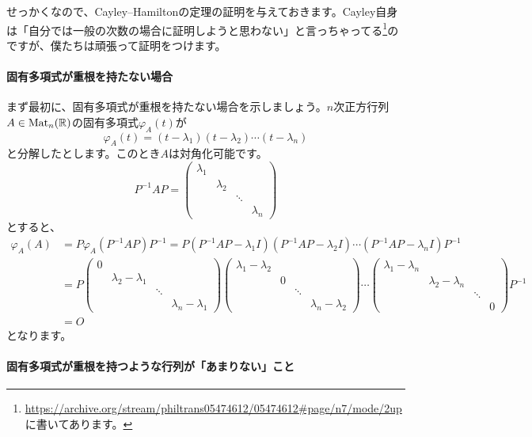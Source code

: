 せっかくなので、Cayley--Hamiltonの定理の証明を与えておきます。Cayley自身は「自分では一般の次数の場合に証明しようと思わない」と言っちゃってる\footnote{\url{https://archive.org/stream/philtrans05474612/05474612\#page/n7/mode/2up}に書いてあります。}のですが、僕たちは頑張って証明をつけます。

\paragraph{固有多項式が重根を持たない場合}

まず最初に、固有多項式が重根を持たない場合を示しましょう。$n$次正方行列$A \in \operatorname{Mat}_n(\mathbb{R})$の固有多項式$\varphi_A(t)$が
\[
\varphi_A(t) = (t - \lambda_1) (t - \lambda_2) \cdots (t - \lambda_n)
\]
と分解したとします。このとき$A$は対角化可能です。
\[
P^{-1} A P = 
\begin{pmatrix}
\lambda_1 \\
& \lambda_2 \\
& & \ddots \\
& & & \lambda_n
\end{pmatrix}
\]
とすると、
\begin{align*}
\varphi_A(A) &= P \varphi_A(P^{-1} A P ) P^{-1}
= P (P^{-1} A P - \lambda_1 I) (P^{-1} A P - \lambda_2 I) \cdots (P^{-1} A P - \lambda_n I) P^{-1} \\
&= 
P 
\begin{pmatrix}
0 \\
& \lambda_2 - \lambda_1 \\
& & \ddots \\
& & & \lambda_n - \lambda_1
\end{pmatrix}
\begin{pmatrix}
\lambda_1 - \lambda_2 \\
& 0 \\
& & \ddots \\
& & & \lambda_n - \lambda_2
\end{pmatrix}
\cdots
\begin{pmatrix}
\lambda_1 - \lambda_n \\
& \lambda_2 - \lambda_n \\
& & \ddots \\
& & & 0
\end{pmatrix}
P^{-1} \\
&= O
\end{align*}
となります。

\paragraph{固有多項式が重根を持つような行列が「あまりない」こと}

